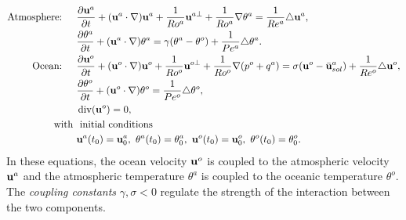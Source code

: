 \documentclass[11pt, oneside]{article}   	%
\numberwithin{equation}{section}
\theoremstyle{plain}
\theoremstyle{definition}
\theoremstyle{remark}
\DeclareMathOperator{\Div}{div}
\newcommand{\<}{\langle}
\renewcommand{\>}{\rangle}
\def\U{{\bf u}}
\begin{document}
\begin{align}
\text{Atmosphere: }\quad&\frac{\partial \U^a}{\partial t}
+(\U^a\cdot\nabla)\U^a
+\frac{1}{Ro^a}\U^{a\bot}
+\frac{1}{Ro^a}\nabla \theta^a
=
\frac{1}{Re^a}\triangle\U^a,\label{COUPLED_SWE_VELOC_A}
\\
& \frac{\partial \theta^a}{\partial t}
+ (\U^a\cdot\nabla)\theta^a
= 
 \gamma(\theta^a - \theta^o)
+\frac{1}{Pe^a}\triangle \theta^a.\label{COUPLED_SWE_T_A}\\
\text{Ocean: }\quad&\frac{\partial \U^o}{\partial t}
+(\U^o\cdot\nabla)\U^o
+\frac{1}{Ro^o}\U^{o\bot}
+\frac{1}{Ro^o}\nabla (p^o+q^a)
=
\sigma(\U^o-\bar{\U}^a_{sol})
+\frac{1}{Re^o}\triangle\U^o,\label{COUPLED_SWE_VELOC_O}\\
&\frac{\partial \theta^o}{\partial t}
+(\U^o\cdot\nabla)\theta^o
=\frac{1}{Pe^o}\triangle\theta^o,\label{COUPLED_SWE_T_O}\\
&\Div(\U^o)=0,\label{COUPLED_SWE_INCOMPRESS_O}\\
\text{with }& \text{ initial conditions }\nonumber\\
&\U^a(t_0)=\U^a_0,\ \theta^a(t_0)=\theta^a_0, \ \U^o(t_0)=\U^o_0,\ \theta^o(t_0)=\theta^o_0\nonumber.
\end{align}
In these equations, the ocean velocity $\U^o$ is coupled to the atmospheric velocity $\U^a$ and the atmospheric temperature $\theta^a$ is coupled to the oceanic temperature $\theta^o$. The {\it coupling constants} $\gamma,\sigma<0$ regulate the strength of the interaction between the two components. 
\end{document}
